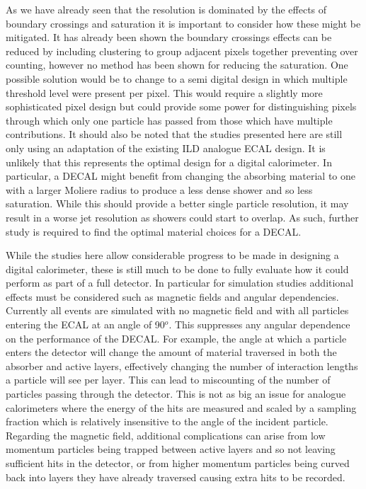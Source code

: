 As we have already seen that the resolution is dominated by the effects of boundary crossings and saturation it is important to consider how these might be mitigated. It has already been shown the boundary crossings effects can be reduced by including clustering to group adjacent pixels together preventing over counting, however no method has been shown for reducing the saturation. One possible solution would be to change to a semi digital design in which multiple threshold level were present per pixel. This would require a slightly more sophisticated pixel design but could provide some power for distinguishing pixels through which only one particle has passed from those which have multiple contributions. It should also be noted that the studies presented here are still only using an adaptation of the existing \ac{ILD} analogue \ac{ECAL} design. It is unlikely that this represents the optimal design for a digital calorimeter. In particular, a \ac{DECAL} might benefit from changing the absorbing material to one with a larger Moliere radius to produce a less dense shower and so less saturation. While this should provide a better single particle resolution, it may result in a worse jet resolution as showers could start to overlap. As such, further study is required to find the optimal material choices for a \ac{DECAL}.


While the studies here allow considerable progress to be made in designing a digital calorimeter, these is still much to be done to fully evaluate how it could perform as part of a full detector. In particular for simulation studies additional effects must be considered such as magnetic fields and angular dependencies. Currently all events are simulated with no magnetic field and with all particles entering the \ac{ECAL} at an angle of 90$^o$. This suppresses any angular dependence on the performance of the \ac{DECAL}. For example, the angle at which a particle enters the detector will change the amount of material traversed in both the absorber and active layers, effectively changing the number of interaction lengths a particle will see per layer. This can lead to miscounting of the number of particles passing through the detector. This is not as big an issue for analogue calorimeters where the energy of the hits are measured and scaled by a sampling fraction which is relatively insensitive to the angle of the incident particle. Regarding the magnetic field, additional complications can arise from low momentum particles being trapped between active layers and so not leaving sufficient hits in the detector, or from higher momentum particles being curved back into layers they have already traversed causing extra hits to be recorded.

